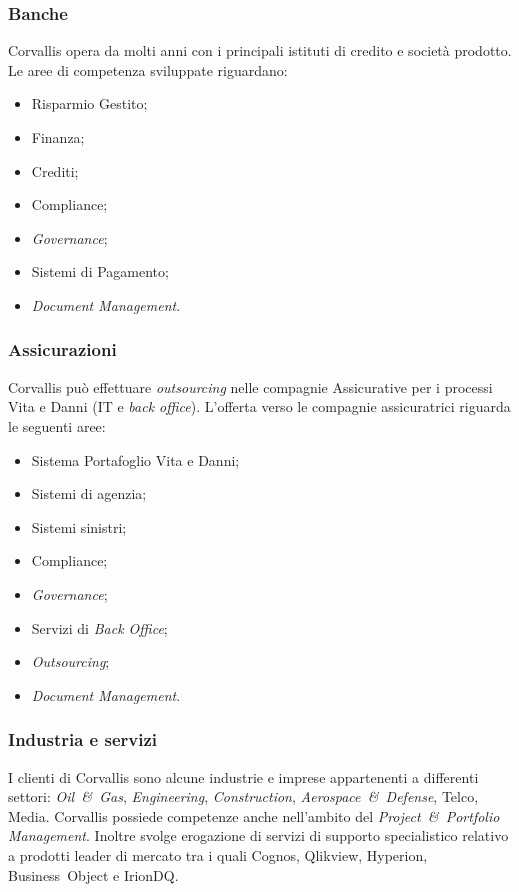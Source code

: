 \subsubsection{Banche}
\label{1.2.1}
Corvallis opera da molti anni con i principali istituti di credito e società prodotto. Le aree di competenza sviluppate riguardano:
\begin{itemize}
\item Risparmio Gestito;
\item Finanza;
\item Crediti;
\item Compliance;
\item \emph{Governance};
\item Sistemi di Pagamento;
\item \emph{Document Management}.\\
\end{itemize}
\subsubsection{Assicurazioni}
\label{1.2.2}
Corvallis può effettuare \emph{outsourcing} nelle compagnie Assicurative per i processi Vita e Danni (IT e \emph{back office}). L'offerta verso le compagnie assicuratrici riguarda le seguenti aree:
\begin{itemize}
\item Sistema Portafoglio Vita e Danni;
\item Sistemi di agenzia;
\item Sistemi sinistri;
\item Compliance;
\item \emph{Governance};
\item Servizi di \emph{Back Office};
\item \emph{Outsourcing};
\item \emph{Document Management}.
\end{itemize}

\subsubsection{Industria e servizi}
\label{1.2.3}
I clienti di Corvallis sono alcune industrie e imprese appartenenti a differenti settori: \emph{Oil~\&~Gas}, \emph{Engineering}, \emph{Construction}, \emph{Aerospace~\&~Defense}, Telco, Media. Corvallis possiede competenze anche nell'ambito del \emph{Project~\&~Portfolio Management}. Inoltre svolge erogazione di servizi di supporto specialistico relativo a prodotti leader di mercato tra i quali Cognos, Qlikview, Hyperion, Business~Object e IrionDQ.
